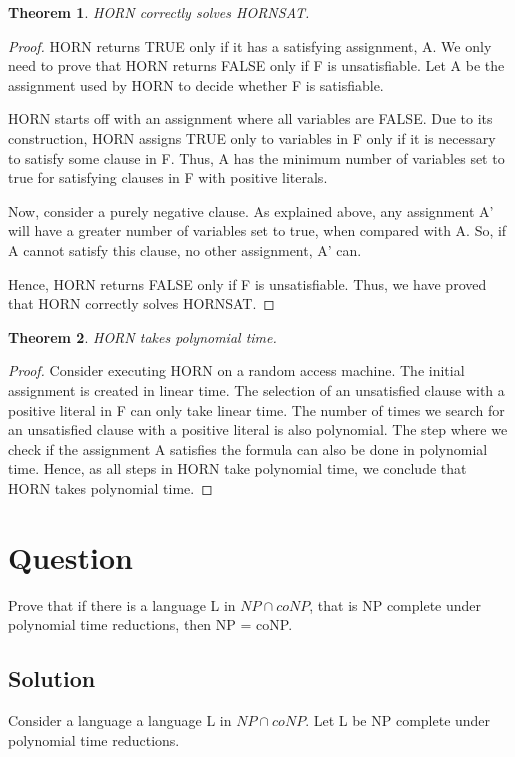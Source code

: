 \documentclass[10pt]{amsart}
\newtheorem{thm}{Theorem}[subsection]
\theoremstyle{remark}
\begin{document}
\begin{thm}
HORN correctly solves HORNSAT.
\end{thm}
\begin{proof}
HORN returns TRUE only if it has a satisfying assignment, A. We only need to prove that HORN returns FALSE only if F is unsatisfiable. Let A be the assignment used by HORN to decide whether F is satisfiable.

HORN starts off with an assignment where all variables are FALSE. Due to its construction, HORN assigns TRUE only to variables in F only if it is necessary to satisfy some clause in F. Thus, A has the minimum number of variables set to true for satisfying clauses in F with positive literals.

Now, consider a purely negative clause. As explained above, any assignment A' will have a greater number of variables set to true, when compared with A. So, if A cannot satisfy this clause, no other assignment, A' can.

Hence, HORN returns FALSE only if F is unsatisfiable. Thus, we have proved that HORN correctly solves HORNSAT.
\end{proof}

\begin{thm}
HORN takes polynomial time.
\end{thm}
\begin{proof}
Consider executing HORN on a random access machine. The initial assignment is created in linear time. The selection of an unsatisfied clause with a positive literal in F can only take linear time. The number of times we search for an unsatisfied clause with a positive literal is also polynomial. The step where we check if the assignment A satisfies the formula can also be done in polynomial time. Hence, as all steps in HORN take polynomial time, we conclude that HORN takes polynomial time.
\end{proof}

\section{Question}
Prove that if there is a language L in $NP \cap coNP$, that is NP complete under polynomial time reductions, then NP = coNP.

\subsection{Solution}
Consider a language a language L in $NP \cap coNP$. Let L be NP complete under polynomial time reductions.
\end{document}

